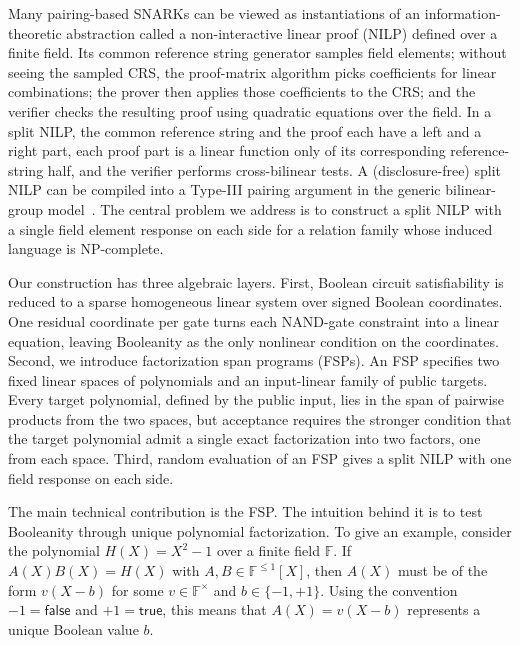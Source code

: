\documentclass[11pt]{article}
\theoremstyle{definition}
\newcommand{\F}{\mathbb F}
\begin{document}
Many pairing-based SNARKs can be viewed as instantiations of an information-theoretic abstraction called a non-interactive linear proof (NILP) defined over a finite field. Its common reference string generator samples field elements; without seeing the sampled CRS, the proof-matrix algorithm picks coefficients for linear combinations; the prover then applies those coefficients to the CRS; and the verifier checks the resulting proof using quadratic equations over the field.  In a split NILP, the common reference
string and the proof each have a left and a right part, each proof part is a
linear function only of its corresponding reference-string half, and the
verifier performs cross-bilinear tests.  A (disclosure-free) split NILP can be
compiled into a Type-III pairing argument in the generic bilinear-group model~\cite{Groth16}. The central problem we address is to construct a split NILP with a single field element response on each side for a relation family whose induced language is NP-complete.

Our construction has three algebraic layers. First, Boolean circuit
satisfiability is reduced to a sparse homogeneous linear system over signed
Boolean coordinates.  One residual coordinate per gate turns each NAND-gate constraint into a linear equation, leaving Booleanity as the only nonlinear condition on the coordinates.  Second, we introduce factorization span programs (FSPs).  An FSP specifies
two fixed linear spaces of polynomials and an input-linear family of public
targets.  Every target polynomial, defined by the public input, lies in the span of pairwise products from the two
spaces, but acceptance requires the stronger condition that the target polynomial admit a
single exact factorization into two factors, one from each space. Third, random evaluation of an FSP gives a split NILP with one field response on each side.

The main technical contribution is the FSP. The intuition behind it is to test Booleanity through unique polynomial factorization. To give an example, consider the polynomial $H(X)=X^2-1$ over a finite field $\F$. If $A(X)B(X)=H(X)$ with $A,B\in\F^{\leq 1}[X]$, then $A(X)$ must be of the form $v(X-b)$ for some $v\in\F^\times$ and $b\in\{-1,+1\}$. Using the convention $-1=\mathsf{false}$ and $+1=\mathsf{true}$, this means that $A(X)=v(X-b)$ represents a unique Boolean value $b$.
\end{document}
